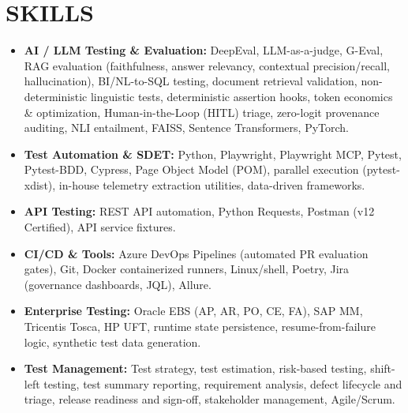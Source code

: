 \documentclass[10pt,a4paper]{article}
\begin{document}
\section{SKILLS}
\footnotesize
\begin{itemize}[leftmargin=*,noitemsep,topsep=1pt]
    \item \textbf{AI / LLM Testing \& Evaluation:} DeepEval, LLM-as-a-judge, G-Eval, RAG evaluation (faithfulness, answer relevancy, contextual precision/recall, hallucination), BI/NL-to-SQL testing, document retrieval validation, non-deterministic linguistic tests, deterministic assertion hooks, token economics \& optimization, Human-in-the-Loop (HITL) triage, zero-logit provenance auditing, NLI entailment, FAISS, Sentence Transformers, PyTorch.
    \item \textbf{Test Automation \& SDET:} Python, Playwright, Playwright MCP, Pytest, Pytest-BDD, Cypress, Page Object Model (POM), parallel execution (pytest-xdist), in-house telemetry extraction utilities, data-driven frameworks.
    \item \textbf{API Testing:} REST API automation, Python Requests, Postman (v12 Certified), API service fixtures.
    \item \textbf{CI/CD \& Tools:} Azure DevOps Pipelines (automated PR evaluation gates), Git, Docker containerized runners, Linux/shell, Poetry, Jira (governance dashboards, JQL), Allure.
    \item \textbf{Enterprise Testing:} Oracle EBS (AP, AR, PO, CE, FA), SAP MM, Tricentis Tosca, HP UFT, runtime state persistence, resume-from-failure logic, synthetic test data generation.
    \item \textbf{Test Management:} Test strategy, test estimation, risk-based testing, shift-left testing, test summary reporting, requirement analysis, defect lifecycle and triage, release readiness and sign-off, stakeholder management, Agile/Scrum.
\end{itemize}

\end{document}
